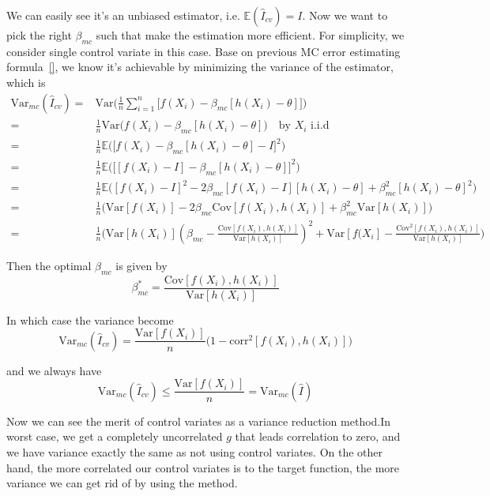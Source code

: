 We can easily see it's an unbiased estimator, i.e. $\mathbb{E}(\hat{I}_{cv}) = I$.
Now we want to pick the right $\beta_{mc}$ such that make the estimation more efficient.
For simplicity, we consider single control variate in this case.
Base on previous MC error estimating formula~\eqref{}, we know it's achievable by minimizing the variance of the estimator, which is 
\begin{align*}
	\mathrm{Var}_{mc}(\hat{I}_{cv})
    =&\mathrm{Var}\Big( \frac{1}{n}\sum_{i=1}^{n}\big[ f(X_i)-\beta_{mc}[h(X_i)-\theta] \big]\Big)\\
    =&\frac{1}{n}\mathrm{Var}\Big(f(X_i)-\beta_{mc}[h(X_i)-\theta]\Big)\quad \text{by $X_i$ i.i.d} \\
    =&\frac{1}{n}\mathbb{E}\Big(\big[f(X_i)-\beta_{mc}[h(X_i)-\theta]-I\big]^2 \Big) \\
    =&\frac{1}{n}\mathbb{E}\Big(\big[ [f(X_i)-I] -\beta_{mc}[h(X_i)-\theta]\big]^2 \Big) \\
    =&\frac{1}{n}\mathbb{E}\big([f(X_i)-I]^2-2\beta_{mc}[f(X_i)-I][h(X_i)-\theta]+\beta_{mc}^2[h(X_i)-\theta]^2 \Big)\\
    =&\frac{1}{n}\Big(\mathrm{Var}[f(X_i)]-2\beta_{mc}\mathrm{Cov}[f(X_i),h(X_i)]+\beta_{mc}^2\mathrm{Var}[h(X_i)]\Big)\\
=&\frac{1}{n}\Big(\mathrm{Var}[h(X_i)](\beta_{mc}-\frac{\mathrm{Cov}[f(X_i),h(X_i)]}{\mathrm{Var}[h(X_i)]})^2+\mathrm{Var}[f(X_i]-\frac{\mathrm{Cov}^2[f(X_i),h(X_i)]}{\mathrm{Var}[h(X_i)]} \Big)
\end{align*}

Then the optimal $\beta_{mc}$ is given by 
\begin{equation}
    \beta_{mc}^*=\frac{\mathrm{Cov}[f(X_i),h(X_i)]}{\mathrm{Var}[h(X_i)]}
    \label{eq:optBeta}
\end{equation}

In which case the variance become
\[
    \mathrm{Var}_{mc}(\hat{I}_{cv})= \frac{\mathrm{Var}[f(X_i)]}{n}\big(1-\mathrm{corr}^2[f(X_i), h(X_i)]\big) 
\]

and we always have 
\[
\mathrm{Var}_{mc}(\hat{I}_{cv}) \leq \frac{\mathrm{Var}[f(X_i)]}{n}=\mathrm{Var}_{mc}(\hat{I})
\]

Now we can see the merit of control variates as a variance reduction method.In worst case, we get a completely uncorrelated $g$ that leads correlation to zero, and we have variance exactly the same as not using control variates. On the other hand, the more correlated our control variates is to the target function, the more variance we can get rid of by using the method.

